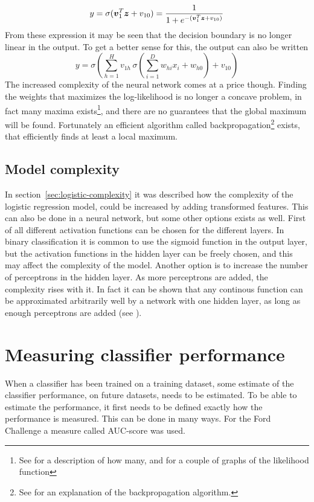 \[
    y = \sigma(\boldsymbol{v}_1^T\boldsymbol{z}+v_{10}) = \frac{1}{1+e^{-(\boldsymbol{v}_1^T\boldsymbol{z}+v_{10})}}
\]
From these expression it may be seen that the decision boundary is no longer linear in the output. To get a better sense for this, the output can also be written
\[
    y = \sigma\left(\sum_{h=1}^H v_{1h}\,\sigma\left(\sum_{i=1}^D w_{hi}x_i + w_{h0}\right)+v_{10}\right)
\]
The increased complexity of the neural network comes at a price though. Finding the weights that maximizes the log-likelihood is no longer a concave problem, in fact many maxima exists\footnote{See \citet[p.237]{bishop} for a description of how many, and \citet[p.297]{duda01} for a couple of graphs of the likelihood function}, and there are no guarantees that the global maximum will be found. Fortunately an efficient algorithm called backpropagation\footnote{See \citet[p.249]{alpaydin10} for an explanation of the backpropagation algorithm.} exists, that efficiently finds at least a local maximum.


\subsection{Model complexity}
In section~\ref{sec:logistic-complexity} it was described how the complexity of the logistic regression model, could be increased by adding transformed features. This can also be done in a neural network, but some other options exists as well. First of all different activation functions can be chosen for the different layers. In binary classification it is common to use the sigmoid function in the output layer, but the activation functions in the hidden layer can be freely chosen, and this may affect the complexity of the model. Another option is to increase the number of perceptrons in the hidden layer. As more perceptrons are added, the complexity rises with it. In fact it can be shown that any continous function can be approximated arbitrarily well by a network with one hidden layer, as long as enough perceptrons are added (see \citet[p.287]{duda01}).


\section{Measuring classifier performance}\label{sec:classifier-performance}
When a classifier has been trained on a training dataset, some estimate of the classifier performance, on future datasets, needs to be estimated. To be able to estimate the performance, it first needs to be defined exactly how the performance is measured. This can be done in many ways. For the Ford Challenge a measure called AUC-score was used.

